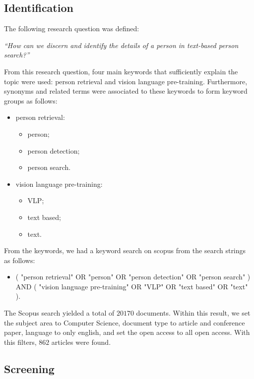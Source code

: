 \subsection*{Identification}

The following research question was defined:

\bigskip
\textit{``How can we discern and identify the details of a person in text-based person search?''}
\bigskip


From this research question, four main keywords that sufficiently explain the topic were used: person retrieval and vision language pre-training.
Furthermore, synonyms and related terms were associated to these keywords to form keyword groups as follows:

\begin{itemize}
    \item person retrieval:
    \begin{itemize}
        \item person;
        \item person detection;
        \item person search.
    \end{itemize}
    \item vision language pre-training:
    \begin{itemize}
        \item VLP;
        \item text based;
        \item text.
    \end{itemize}
\end{itemize}


From the keywords, we had a keyword search on scopus from the search strings as follows:

\begin{itemize}
    \item ( "person retrieval" OR "person" OR "person detection" OR "person search" ) AND ( "vision language pre-training" OR "VLP" OR "text based" OR "text" ).
\end{itemize}

The Scopus search yielded a total of $20170$ documents. Within this result, we set the subject area to Computer Science, document type to article and conference paper, language to only english, and set the open access to all open access. With this filters, $862$ articles were found. 

\subsection*{Screening}

